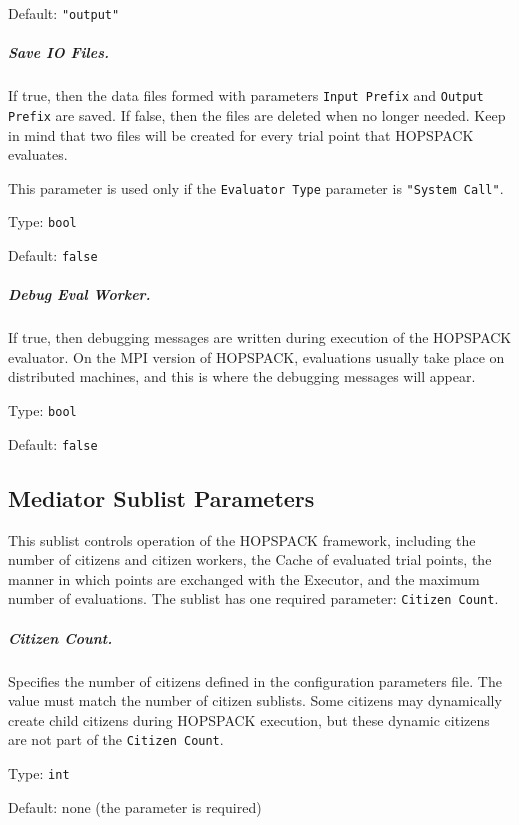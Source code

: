 \hspace{0.2in}
Default: {\tt "output"}

\subparagraph{Save IO Files.}  \label{param:EV-savefiles}
If true, then the data files formed with parameters {\tt Input Prefix}
and {\tt Output Prefix} are saved.  If false, then the files are deleted
when no longer needed.  Keep in mind that two files will be created for every
trial point that HOPSPACK evaluates.

\noindent
This parameter is used only if the {\tt Evaluator Type} parameter is
{\tt"System Call"}.

\hspace{0.2in}
Type: {\tt bool}

\hspace{0.2in}
Default: {\tt false}

\subparagraph{Debug Eval Worker.}  \label{param:EV-debug}
If true, then debugging messages are written during execution of the
HOPSPACK evaluator.  On the MPI version of HOPSPACK, evaluations usually take
place on distributed machines, and this is where the debugging messages
will appear.

\hspace{0.2in}
Type: {\tt bool}

\hspace{0.2in}
Default: {\tt false}


\subsection{Mediator Sublist Parameters}
\label{subconfig:ME}

This sublist controls operation of the HOPSPACK framework, including the
number of citizens and citizen workers, the Cache of evaluated trial points,
the manner in which points are exchanged with the Executor, and the maximum
number of evaluations.
The sublist has one required parameter: {\tt Citizen Count}.

\subparagraph{Citizen Count.}  \label{param:MD-ctzns}
Specifies the number of citizens defined in the configuration parameters file.
The value must match the number of citizen sublists.  Some citizens may
dynamically create child citizens during HOPSPACK execution, but these dynamic
citizens are not part of the {\tt Citizen Count}.

\hspace{0.2in}
Type: {\tt int}

\hspace{0.2in}
Default: none (the parameter is required)

